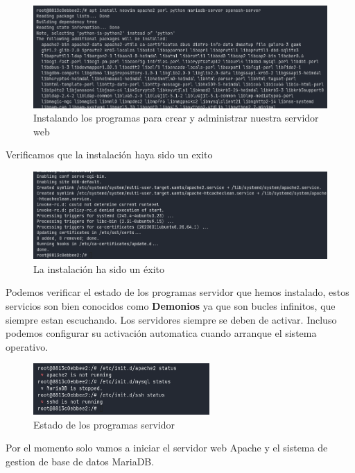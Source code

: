\begin{figure}[H]
  \centering
  \includegraphics[width=1.0\textwidth]{img/install_programs.png}
  \caption{Instalando los programas para crear y administrar nuestra servidor web}
\end{figure}

Verificamos que la instalación haya sido un exito

\begin{figure}[H]
  \centering
  \includegraphics[width=1.0\textwidth]{img/check_install.png}
  \caption{La instalación ha sido un éxito}
\end{figure}

Podemos verificar el estado de los programas servidor que hemos instalado, estos servicios son bien conocidos 
como \textbf{Demonios} ya que son bucles infinitos, que siempre estan escuchando. Los servidores siempre se 
deben de activar. Incluso podemos configurar su activación automatica cuando arranque el sistema operativo.

\begin{figure}[H]
  \centering
  \includegraphics[width=0.6\textwidth]{img/check_daemons.png}
  \caption{Estado de los programas servidor}
\end{figure}

Por el momento solo vamos a iniciar el servidor web Apache y el sistema de gestion de base de datos MariaDB.

